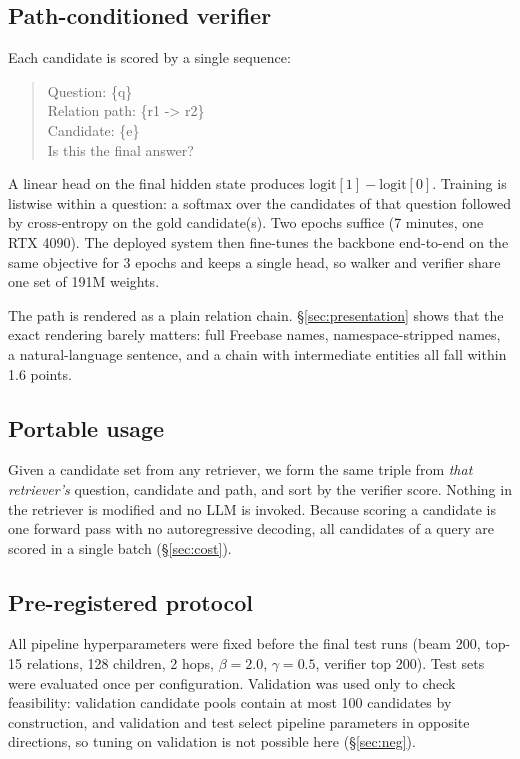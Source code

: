 \documentclass[sigconf,review]{acmart}
\begin{document}
\subsection{Path-conditioned verifier}
\label{sec:verifier}
Each candidate is scored by a single sequence:
\begin{quote}\ttfamily\small
Question: \{q\}\\
Relation path: \{r1 -> r2\}\\
Candidate: \{e\}\\
Is this the final answer?
\end{quote}
A linear head on the final hidden state produces $\mathrm{logit}[1]-\mathrm{logit}[0]$. Training is listwise within a question: a softmax over the candidates of that question followed by cross-entropy on the gold candidate(s). Two epochs suffice (7 minutes, one RTX 4090). The deployed system then fine-tunes the backbone end-to-end on the same objective for 3 epochs and keeps a single head, so walker and verifier share one set of 191M weights.

The path is rendered as a plain relation chain. \S\ref{sec:presentation} shows that the exact rendering barely matters: full Freebase names, namespace-stripped names, a natural-language sentence, and a chain with intermediate entities all fall within 1.6 points.\label{sec:presentation}

\subsection{Portable usage}
\label{sec:portable}
Given a candidate set from any retriever, we form the same triple from \emph{that retriever's} question, candidate and path, and sort by the verifier score. Nothing in the retriever is modified and no LLM is invoked. Because scoring a candidate is one forward pass with no autoregressive decoding, all candidates of a query are scored in a single batch (\S\ref{sec:cost}).

\subsection{Pre-registered protocol}
\label{sec:protocol}
All pipeline hyperparameters were fixed before the final test runs (beam 200, top-15 relations, 128 children, 2 hops, $\beta=2.0$, $\gamma=0.5$, verifier top 200). Test sets were evaluated once per configuration. Validation was used only to check feasibility: validation candidate pools contain at most 100 candidates by construction, and validation and test select pipeline parameters in opposite directions, so tuning on validation is not possible here (\S\ref{sec:neg}).
\end{document}

